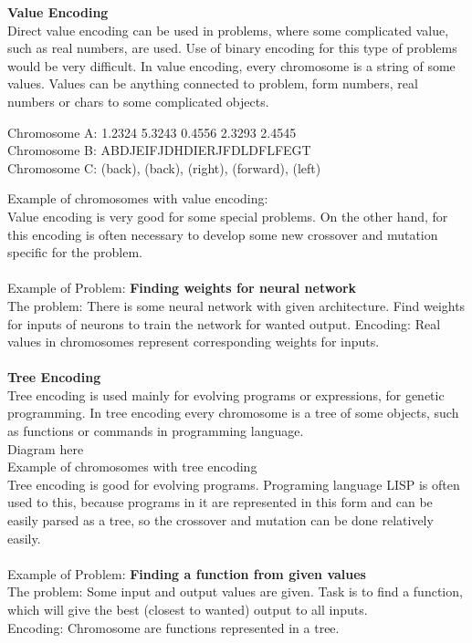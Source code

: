 \documentclass[a4paper, 12pt]{article}
\begin{document}
\textbf{Value Encoding}\\
Direct value encoding can be used in problems, where some complicated value, such as real numbers, are used. Use of binary encoding for this
type of problems would be very difficult. In value encoding, every chromosome is a string of some values. Values can be anything connected to 
problem, form numbers, real numbers or chars to some complicated objects.\\
\begin{center}
Chromosome A: 1.2324  5.3243  0.4556  2.3293  2.4545\\
Chromosome B: ABDJEIFJDHDIERJFDLDFLFEGT\\
Chromosome C: (back), (back), (right), (forward), (left)
\end{center}
Example of chromosomes with value encoding:\\
Value encoding is very good for some special problems. On the other hand, for this encoding is often necessary to develop some new crossover and mutation specific for the problem.\\~\\
Example of Problem: \textbf{Finding weights for neural network}\\
The problem: There is some neural network with given architecture. Find weights for inputs of neurons to train the network for wanted output.
Encoding: Real values in chromosomes represent corresponding weights for inputs.\\~\\
\textbf{Tree Encoding}\\
Tree encoding is used mainly for evolving programs or expressions, for genetic programming. In tree encoding every chromosome is a tree of some objects, such as functions or commands in programming language. \\
Diagram here\\
 Example of chromosomes with tree encoding\\
Tree encoding is good for evolving programs. Programing language LISP is often used to this, because programs in it are represented in this form and can be easily parsed as a tree, so the crossover and mutation can be done relatively easily.\\~\\
Example of Problem: \textbf{Finding a function from given values}\\
The problem: Some input and output values are given. Task is to find a function, which will give the best (closest to wanted) output to all inputs.\\
Encoding: Chromosome are functions represented in a tree.
\end{document}

